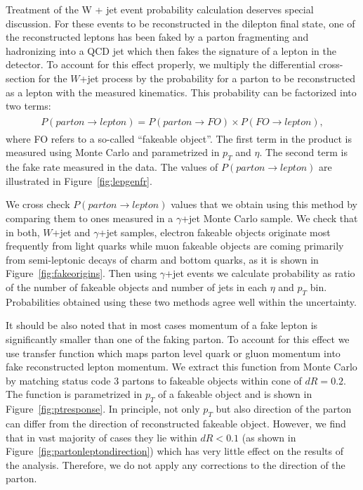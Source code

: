 \documentclass{cmspaper}
\begin{document}
Treatment of the W + jet event probability calculation deserves special discussion. For these events to be 
reconstructed in the dilepton final state, one of the reconstructed leptons has been faked by a parton 
fragmenting and hadronizing into a QCD jet which then fakes the signature of a lepton in the detector. 
To account for this effect properly, we multiply the differential cross-section for the $W$+jet process by the 
probability for a parton to be reconstructed as a lepton with the measured kinematics. This probability can be 
factorized into two terms:
\begin{eqnarray}
\begin{array}{lcl}
P(parton\rightarrow lepton)=P(parton\rightarrow FO) \times P(FO\rightarrow lepton),
\end{array} 
\end{eqnarray} 
where FO refers to a so-called ``fakeable object''. The first term in the product is measured using Monte Carlo and 
parametrized in $p_{T}$ and $\eta$. The second term is the fake rate measured in the data. The values 
of $P(parton \rightarrow lepton)$ are illustrated in Figure~\ref{fig:lepgenfr}. 

We cross check $P(parton \rightarrow lepton)$ values that we obtain using this method by comparing them to ones measured in a $\gamma$+jet 
Monte Carlo sample. We check that in both, $W$+jet and  $\gamma$+jet samples, electron fakeable objects originate 
most frequently from light quarks while muon fakeable objects are coming primarily from semi-leptonic decays of charm and bottom quarks, 
as it is shown in Figure~\ref{fig:fakeorigins}.
Then using  $\gamma$+jet events we calculate probability as ratio of the number of fakeable objects and number of jets in each $\eta$ and $p_{T}$ bin.
Probabilities obtained using these two methods agree well within the uncertainty. 

It should be also
noted that in most cases momentum of a fake lepton is significantly smaller than one of the faking parton. To account 
for this effect we use transfer function which maps parton level quark or gluon momentum into fake reconstructed lepton
momentum. We extract this function from Monte Carlo by matching status code 3 partons to fakeable objects within 
cone of $dR=0.2$. The function is parametrized in $p_{T}$ of a fakeable object and is shown in Figure~\ref{fig:ptresponse}.
In principle, not only $p_{T}$ but also direction of the parton can differ from the direction of reconstructed fakeable object.
However, we find that in vast majority of cases they lie within $dR<0.1$ (as shown in Figure~\ref{fig:partonleptondirection}) 
which has very little effect on the results of the analysis. Therefore, we do not apply any corrections to the direction
of the parton.
\end{document}
